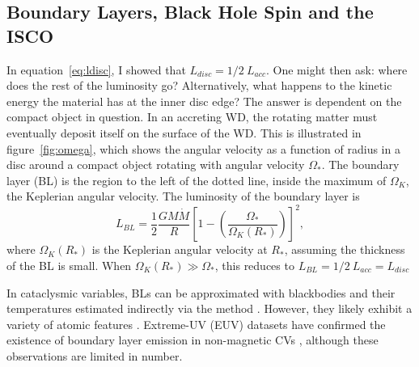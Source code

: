 \subsection{Boundary Layers, Black Hole Spin and the ISCO}
\label{sec:bl_isco}
In equation~\ref{eq:ldisc}, I showed that $L_{disc} = 1/2~L_{acc}$. 
One might then ask: where does the rest of the luminosity go? Alternatively, 
what happens to the kinetic energy the material has at the inner disc edge?
The answer is dependent on the compact object in question. 
In an accreting WD, the rotating matter must eventually deposit itself 
on the surface of the WD. This is illustrated in figure~\ref{fig:omega},
which shows the angular velocity as a function of radius in a disc around
a compact object rotating with angular velocity $\Omega_*$. The boundary layer (BL)
is the region to the left of the dotted line, inside the maximum of $\Omega_K$, the Keplerian
angular velocity. The luminosity of the boundary layer is \citep{fkrbook}
\begin{equation}
L_{BL} = \frac{1}{2}\frac{GM \dot{M}}{R} \left[1 - \left(\frac{\Omega_*}{\Omega_K(R_*)}\right)\right]^2,
\end{equation}
where $\Omega_K(R_*)$ is the Keplerian angular velocity at $R_*$, assuming the thickness
of the BL is small. When $\Omega_K(R_*) \gg {\Omega_*}$, this reduces to 
$L_{BL} = 1/2~L_{acc} = L_{disc}$

In cataclysmic variables, 
BLs can be approximated with blackbodies and their temperatures estimated
indirectly via the \cite{zanstra1929} method \citep[e.g.][]{hoare1991,hoaredrew1993}.
However, they likely exhibit a variety of atomic features \citep{suleimanov2014}.
Extreme-UV (EUV) datasets have confirmed the existence of boundary layer emission
in non-magnetic CVs \citep{mauche1996}, although these observations
are limited in number.

